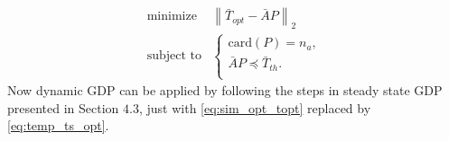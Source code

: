 \begin{equation}\label{eq:temp_ts_opt}
\begin{split}
\text{minimize } &  \left \| \bar{T}_{opt}-\bar{A}P \right \|_{2}\\
\text{subject to} &\left\{
\begin{array}{lr}
\text{card}(P) = n_{a},\\
\bar{A}P \preceq \bar{T}_{th}.\\
\end{array}
\right.
\end{split}
\end{equation}
Now dynamic GDP can be
applied by following the steps in steady state GDP presented in
Section $4.3$, just with \eqref{eq:sim_opt_topt} replaced
by \eqref{eq:temp_ts_opt}.